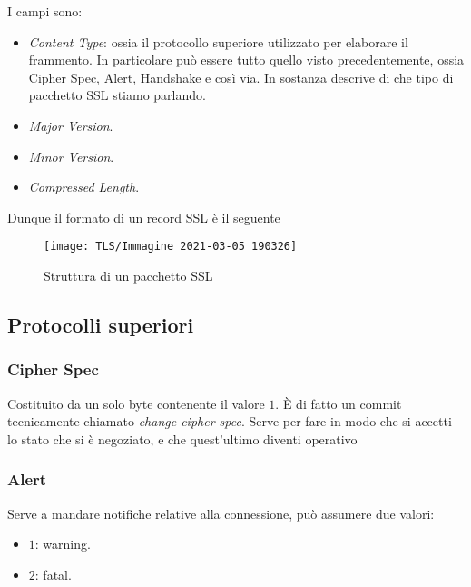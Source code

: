 \documentclass[14pt]{extreport}
\begin{document}
I campi sono:

\begin{itemize}
    \item \textit{Content Type}: ossia il protocollo superiore utilizzato per elaborare il frammento. In particolare può essere tutto quello visto precedentemente, ossia Cipher Spec, Alert, Handshake e così via. In sostanza descrive di che tipo di pacchetto SSL stiamo parlando.
    
    \item \textit{Major Version}.
    
    
    \item \textit{Minor Version}.
    
    
    \item \textit{Compressed Length}.
\end{itemize}
Dunque il formato di un record SSL è il seguente



\begin{figure}[H]
    \centering
    \texttt{[image: TLS/Immagine 2021-03-05 190326]}
    \caption{Struttura di un pacchetto SSL}
\end{figure}







\subsection{Protocolli superiori}

\subsubsection{Cipher Spec}

Costituito da un solo byte contenente il valore $1$. È di fatto un commit tecnicamente chiamato \textit{change cipher spec}. Serve per fare in modo che si accetti lo stato che si è negoziato, e che quest'ultimo diventi operativo


\subsubsection{Alert}
Serve a mandare notifiche relative alla connessione, può assumere due valori:


\begin{itemize}
    \item $1$: warning.
    
    \item $2$: fatal.
\end{itemize}
\end{document}
